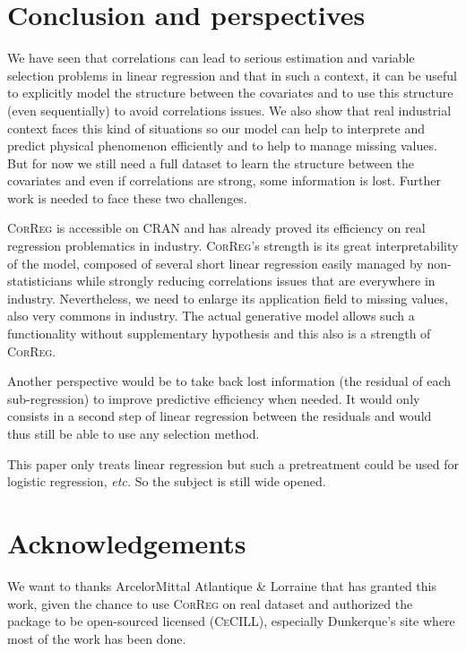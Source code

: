 \documentclass[11pt,a4paper]{article}
\begin{document}
\section{Conclusion and perspectives}
	We have seen that correlations can lead to serious estimation and variable selection problems in linear regression and that in such a context, it can be useful to explicitly model the structure between the covariates and to use this structure (even sequentially) to avoid correlations issues. We also show that real industrial context faces this kind of situations so our model can help to interprete and predict physical phenomenon efficiently and to help to manage missing values. But for now we still need a full dataset to learn the structure between the covariates and even if correlations are strong, some information is lost. Further work is needed to face these two challenges.
	
	\textsc{CorReg} is accessible on CRAN and has already proved its efficiency on real regression problematics in industry. \textsc{CorReg}'s strength is its great interpretability of the model, composed of several short linear regression easily managed by non-statisticians while strongly reducing correlations issues that are everywhere in industry.
	Nevertheless, we need to enlarge its application field to missing values, also very commons in industry. The actual generative model allows such a functionality without supplementary hypothesis and this also is a strength of \textsc{CorReg}. 
	
	Another perspective would be to take back lost information (the residual of each sub-regression) to improve predictive efficiency when needed. It would only consists in a second step of linear regression between the residuals and would thus still be able to use any selection method.
	
	This paper only treats linear regression but such a pretreatment could be used for logistic regression, {\it etc.}
	So the subject is still wide opened.	

\section{Acknowledgements}
	We want to thanks ArcelorMittal Atlantique \& Lorraine that has granted this work, given the chance to use \textsc{CorReg} on real dataset and authorized the package to be open-sourced licensed (\textsc{CeCILL}), especially Dunkerque's site where most of the work has been done.
{}

\end{document}
